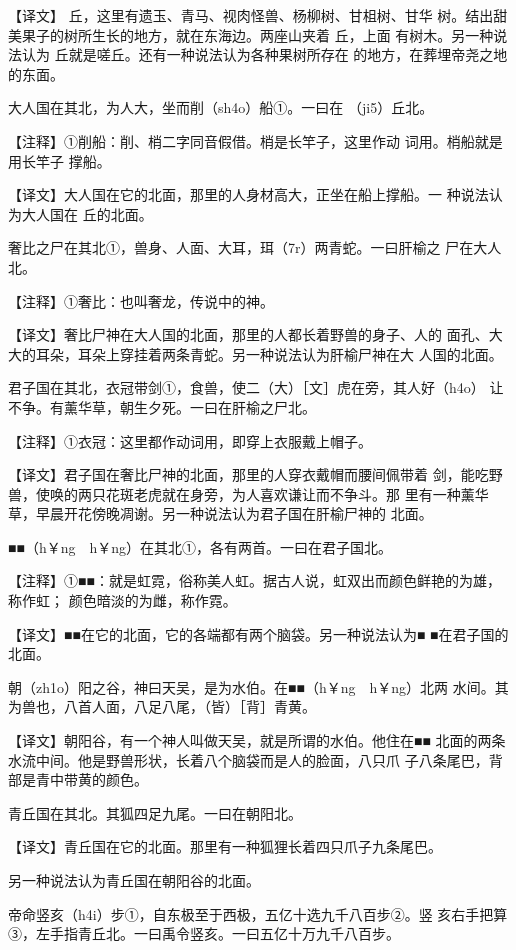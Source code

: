 \documentclass[a4paper,12pt,UTF8,twoside]{ctexbook}
\begin{document}
【译文】 丘，这里有遗玉、青马、视肉怪兽、杨柳树、甘柤树、甘华 树。结出甜美果子的树所生长的地方，就在东海边。两座山夹着 丘，上面 有树木。另一种说法认为 丘就是嗟丘。还有一种说法认为各种果树所存在 的地方，在葬埋帝尧之地的东面。

大人国在其北，为人大，坐而削（sh4o）船①。一曰在 （ji5）丘北。

【注释】①削船：削、梢二字同音假借。梢是长竿子，这里作动 词用。梢船就是用长竿子 撑船。

【译文】大人国在它的北面，那里的人身材高大，正坐在船上撑船。一 种说法认为大人国在 丘的北面。

奢比之尸在其北①，兽身、人面、大耳，珥（7r）两青蛇。一曰肝榆之 尸在大人北。

【注释】①奢比：也叫奢龙，传说中的神。

【译文】奢比尸神在大人国的北面，那里的人都长着野兽的身子、人的 面孔、大大的耳朵，耳朵上穿挂着两条青蛇。另一种说法认为肝榆尸神在大 人国的北面。

君子国在其北，衣冠带剑①，食兽，使二（大）［文］虎在旁，其人好（h4o） 让不争。有薰华草，朝生夕死。一曰在肝榆之尸北。

【注释】①衣冠：这里都作动词用，即穿上衣服戴上帽子。

【译文】君子国在奢比尸神的北面，那里的人穿衣戴帽而腰间佩带着 剑，能吃野兽，使唤的两只花斑老虎就在身旁，为人喜欢谦让而不争斗。那 里有一种薰华草，早晨开花傍晚凋谢。另一种说法认为君子国在肝榆尸神的 北面。

■■（h￥ng　h￥ng）在其北①，各有两首。一曰在君子国北。

【注释】①■■：就是虹霓，俗称美人虹。据古人说，虹双出而颜色鲜艳的为雄，称作虹； 颜色暗淡的为雌，称作霓。

【译文】■■在它的北面，它的各端都有两个脑袋。另一种说法认为■ ■在君子国的北面。

朝（zh1o）阳之谷，神曰天吴，是为水伯。在■■（h￥ng　h￥ng）北两 水间。其为兽也，八首人面，八足八尾，（皆）［背］青黄。

【译文】朝阳谷，有一个神人叫做天吴，就是所谓的水伯。他住在■■ 北面的两条水流中间。他是野兽形状，长着八个脑袋而是人的脸面，八只爪 子八条尾巴，背部是青中带黄的颜色。

青丘国在其北。其狐四足九尾。一曰在朝阳北。

【译文】青丘国在它的北面。那里有一种狐狸长着四只爪子九条尾巴。

另一种说法认为青丘国在朝阳谷的北面。

帝命竖亥（h4i）步①，自东极至于西极，五亿十选九千八百步②。竖 亥右手把算③，左手指青丘北。一曰禹令竖亥。一曰五亿十万九千八百步。
\end{document}
